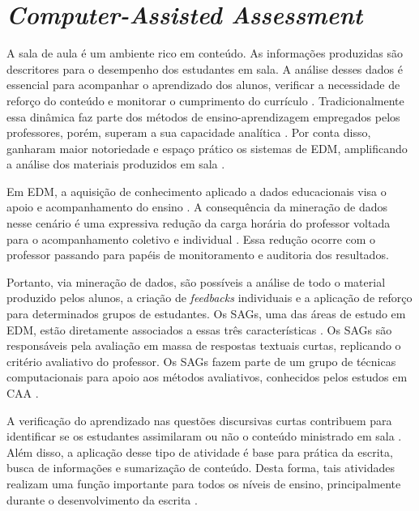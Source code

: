 \section{\textit{Computer-Assisted Assessment}}

A sala de aula é um ambiente rico em conteúdo. As informações produzidas são descritores para o desempenho dos estudantes em sala. A análise desses dados é essencial para acompanhar o aprendizado dos alunos, verificar a necessidade de reforço do conteúdo e monitorar o cumprimento do currículo \cite{sweta2021}. Tradicionalmente essa dinâmica faz parte dos métodos de ensino-aprendizagem empregados pelos professores, porém, superam a sua capacidade analítica \cite{madero2019}. Por conta disso, ganharam maior notoriedade e espaço prático os sistemas de EDM, amplificando a análise dos materiais produzidos em sala \cite{siemens2012, romero2010}.

Em EDM, a aquisição de conhecimento aplicado a dados educacionais visa o apoio e acompanhamento do ensino \cite{ferreira-mello2019}. A consequência da mineração de dados nesse cenário é uma expressiva redução da carga horária do professor voltada para o acompanhamento coletivo e individual \cite{sweta2021}. Essa redução ocorre com o professor passando para papéis de monitoramento e auditoria dos resultados.

Portanto, via mineração de dados, são possíveis a análise de todo o material produzido pelos alunos, a criação de \textit{feedbacks} individuais e a aplicação de reforço para determinados grupos de estudantes. Os SAGs, uma das áreas de estudo em EDM, estão diretamente associados a essas três características \cite{burrows2015}. Os SAGs são responsáveis pela avaliação em massa de respostas textuais curtas, replicando o critério avaliativo do professor. Os SAGs fazem parte de um grupo de técnicas computacionais para apoio aos métodos avaliativos, conhecidos pelos estudos em CAA \cite{perez-marin2009}.

A verificação do aprendizado nas questões discursivas curtas contribuem para identificar se os estudantes assimilaram ou não o conteúdo ministrado em sala \cite{oliveira2013}. Além disso, a aplicação desse tipo de atividade é base para prática da escrita, busca de informações e sumarização de conteúdo. Desta forma, tais atividades realizam uma função importante para todos os níveis de ensino, principalmente durante o desenvolvimento da escrita \cite{johnstone2002}. 


